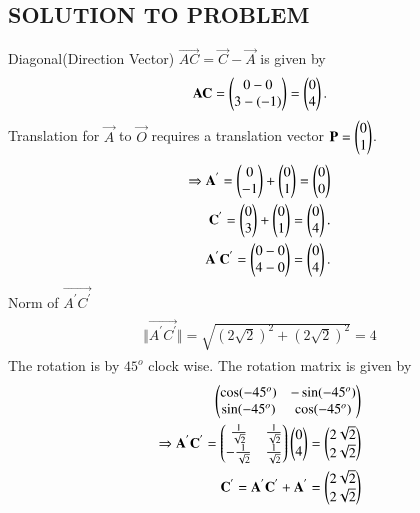 \documentclass[journal,12pt,twocolumn]{IEEEtran}
\begin{document}
\subsection{SOLUTION TO PROBLEM}
Diagonal(Direction Vector) $\vec{AC} = \vec{C}-\vec{A} $  is given by
\begin{align}
\begin{split}
\mathbf{AC} = \begin{pmatrix}0 - 0\\3 - (-1)\end{pmatrix} = \begin{pmatrix}0\\4\end{pmatrix}.
\end{split}
\end{align}
Translation for $\vec{A}$ to $\vec{O}$ requires a translation vector $ \mathbf{P}=\begin{pmatrix}0\\1\end{pmatrix}$.
\begin{align}
\begin{split}
\Rightarrow
\mathbf{A^{'}} = \begin{pmatrix}0 \\ -1\end{pmatrix}  + \begin{pmatrix}0\\1\end{pmatrix} = \begin{pmatrix}0\\0\end{pmatrix} &\\
\mathbf{C^{'}} = \begin{pmatrix}0 \\ 3\end{pmatrix} + \begin{pmatrix}0\\1\end{pmatrix} = \begin{pmatrix}0\\4\end{pmatrix}.\\
\mathbf{A^{'}C^{'}} = \begin{pmatrix}0 - 0\\4- 0\end{pmatrix} = \begin{pmatrix}0\\4\end{pmatrix}.
\end{split}
\end{align}
Norm of $\vec{A^{'}C^{'}}$
\begin{align}
\begin{split}
\Vert\vec{A^{'}C^{'}}\Vert = \sqrt{(2\sqrt{2})^{2}+(2\sqrt{2})^{2}} = 4
\end{split}
\end{align}
The rotation is by $45^{o}$ clock wise. The rotation matrix is given by 
\begin{align}
\begin{split}
\begin{pmatrix}\cos (-45^{o}) & -\sin (-45^{o})\\\sin (-45^{o}) & \cos (-45^{o})\end{pmatrix}\\ 
\Rightarrow \mathbf{A^{'}C^{'}} =   \begin{pmatrix}\frac{1}{\sqrt{2}} & \frac{1}{\sqrt{2}} \\ -\frac{1}{\sqrt{2}} & \frac{1}{\sqrt{2}}\end{pmatrix} \begin{pmatrix}0 \\ 4\end{pmatrix}= \begin{pmatrix}2\sqrt{2}\\2\sqrt{2}\end{pmatrix}\\
\mathbf{C^{'}}=\mathbf{A^{'}C^{'}}+\mathbf{A^{'}}=\begin{pmatrix}2\sqrt{2}\\2\sqrt{2}\end{pmatrix}
\end{split}
\end{align}
\end{document}
